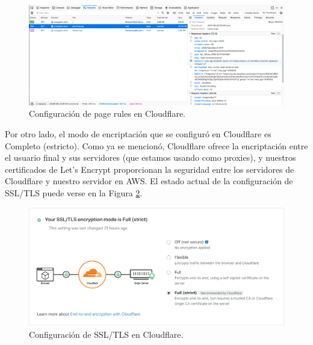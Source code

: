 \documentclass{article}
\begin{document}

\begin{figure}[H]
  \centering
  \includegraphics[width=\textwidth]{cloudflare/pageRulesHit}
  \caption{Configuraci\'on de page rules en Cloudflare.}
  \label{fig:pageRulesHit}
\end{figure}

Por otro lado, el modo de encriptaci\'on que se
configur\'o en Cloudflare es Completo (estricto).
Como ya se mencion\'o, Cloudflare ofrece la
encriptaci\'on entre el usuario final y sus
servidores (que estamos usando como proxies),
y nuestros certificados de Let's Encrypt proporcionan
la seguridad entre los servidores de Cloudflare
y nuestro servidor en AWS.   El estado actual de
la configuraci\'on de SSL/TLS puede verse en la
Figura \ref{fig:cfEncryption}.

\begin{figure}[H]
  \centering
  \includegraphics[width=\textwidth]{cloudflare/cfEncryption}
  \caption{Configuraci\'on de SSL/TLS en Cloudflare.}
  \label{fig:cfEncryption}
\end{figure}


\end{document}
